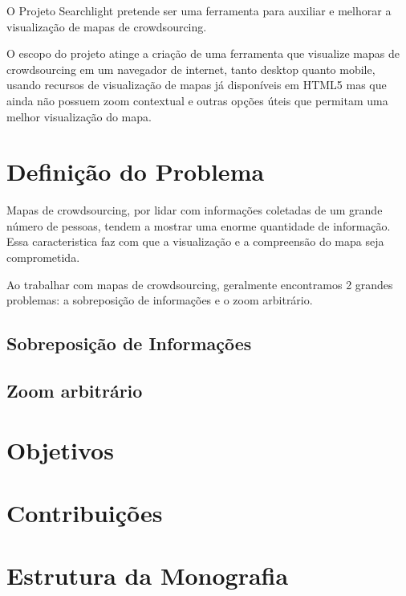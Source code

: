 O Projeto Searchlight pretende ser uma ferramenta para auxiliar e melhorar a visualização de mapas de crowdsourcing.

O escopo do projeto atinge a criação de uma ferramenta que visualize mapas de crowdsourcing em um navegador de internet, tanto desktop quanto mobile, usando recursos de visualização de mapas já disponíveis em HTML5 mas que ainda não possuem zoom contextual e outras opções úteis que permitam uma melhor visualização do mapa.


\section{Definição do Problema}

Mapas de crowdsourcing, por lidar com informações coletadas de um grande número de pessoas,  tendem a mostrar uma enorme quantidade de informação. 
Essa caracteristica faz com que a visualização e a compreensão do mapa seja comprometida.
 
Ao trabalhar com mapas de crowdsourcing, geralmente encontramos 2 grandes problemas: a sobreposição de informações e o zoom arbitrário. 

\subsection{Sobreposição de Informações}

\subsection{Zoom arbitrário}

\section{Objetivos}

\section{Contribuições}

\section{Estrutura da Monografia}
